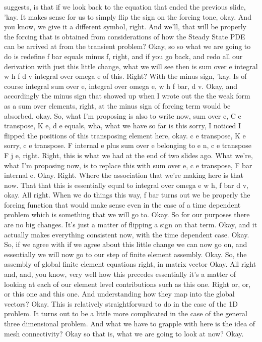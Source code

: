 \documentclass[10pt]{article}
\begin{document}
suggests, is that if we look back to the equation that ended the previous slide, 'kay. It makes sense for us to simply flip the sign on the forcing tone, okay. And you know, we give it a different symbol, right. And we'll, that will be properly the forcing that is obtained from considerations of how the Steady State PDE can be arrived at from the transient problem? Okay, so so what we are going to do is redefine f bar equals minus f, right, and if you go back, and redo all our derivation with just this little change, what we will see then is sum over e integral w h f d v integral over omega e of this. Right? With the minus sign, 'kay. Is of course integral sum over e, integral over omega e, w h f bar, d v. Okay, and accordingly the minus sign that showed up when I wrote out the the weak form as a sum over elements, right, at the minus sign of forcing term would be absorbed, okay. So, what I'm proposing is also to write now, sum over e, C e transpose, K e, d e equals, wha, what we have so far is this sorry, I noticed I flipped the positions of this transposing element here, okay. c e transpose, K e sorry, c e transpose. F internal e plus sum over e belonging to e n, c e transpose F j e, right. Right, this is what we had at the end of two slides ago. What we're, what I'm proposing now, is to replace this with sum over e, c e transpose, F bar internal e. Okay. Right. Where the association that we're making here is that now. That that this is essentially equal to integral over omega e w h, f bar d v, okay. All right. When we do things this way, f bar turns out we be properly the forcing function that would make sense even in the case of a time dependent problem which is something that we will go to. Okay. So for our purposes there are no big changes. It's just a matter of flipping a sign on that term. Okay, and it actually makes everything consistent now, with the time dependent case. Okay. So, if we agree with if we agree about this little change we can now go on, and essentially we will now go to our step of finite element assembly. Okay. So, the assembly of global finite element equations right, in matrix vector Okay. All right and, and, you know, very well how this precedes essentially it's a matter of looking at each of our element level contributions such as this one. Right or, or, or this one and this one. And understanding how they map into the global vectors? Okay. This is relatively straightforward to do in the case of the 1D problem. It turns out to be a little more complicated in the case of the general three dimensional problem. And what we have to grapple with here is the idea of mesh connectivity? Okay so that is, what we are going to look at now? Okay.
\end{document}
